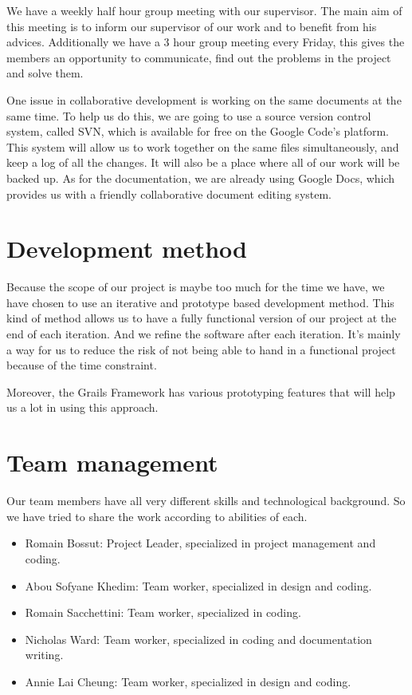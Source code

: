 \documentclass[a4paper,12pt]{article}
\begin{document}
We have a weekly half hour group meeting with our supervisor. The main aim of this meeting is to inform our supervisor of our work and to benefit from his advices.
Additionally we have a 3 hour group meeting every Friday, this gives the members an opportunity to communicate, find out the problems in the project and solve them.

One issue in collaborative development is working on the same documents at the same time. To help us do this, we are going to use a source version control system, called SVN, which is available for free on the Google Code's platform. This system will allow us to work together on the same files simultaneously, and keep a log of all the changes. It will also be a place where all of our work will be backed up.
As for the documentation, we are already using Google Docs, which provides us with a friendly collaborative document editing system.

\section{Development method}
Because the scope of our project is maybe too much for the time we have, we have chosen to use an iterative and prototype based development method.
This kind of method allows us to have a fully functional version of our project at the end of each iteration. And we refine the software after each iteration.
It's mainly a way for us to reduce the risk of not being able to hand in a functional project because of the time constraint.

Moreover, the Grails Framework has various prototyping features that will help us a lot in using this approach.

\section{Team management}
Our team members have all very different skills and technological background. So we have tried to share the work according to abilities of each.
\begin{itemize}
\item Romain Bossut: Project Leader, specialized in project management and coding.
\item Abou Sofyane Khedim: Team worker, specialized in design and coding.
\item Romain Sacchettini: Team worker, specialized in coding.
\item Nicholas Ward: Team worker, specialized in coding and documentation writing.
\item Annie Lai Cheung: Team worker, specialized in design and coding.
\end{itemize}
\end{document}
